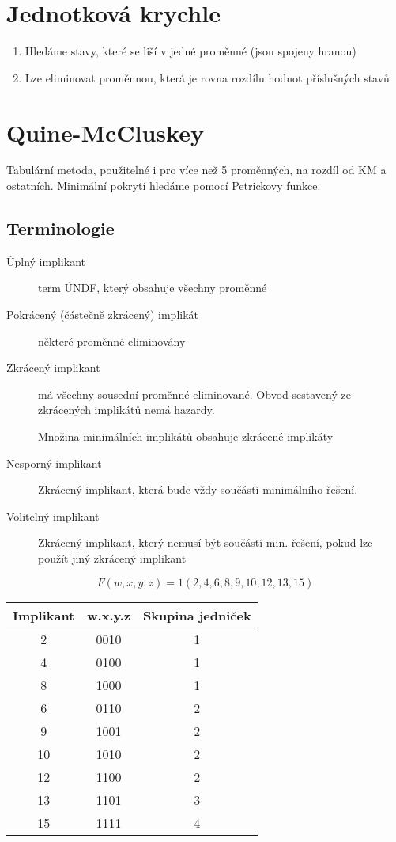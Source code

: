 \documentclass[a4paper, 11pt]{report}
\begin{document}
\section{Jednotková krychle}

\begin{enumerate}
	\item Hledáme stavy, které se liší v jedné proměnné (jsou spojeny hranou)
	\item Lze eliminovat proměnnou, která je rovna rozdílu hodnot příslušných stavů
\end{enumerate}

\section{Quine-McCluskey}

Tabulární metoda, použitelné i pro více než 5 proměnných, na rozdíl od KM a ostatních. Minimální pokrytí hledáme pomocí Petrickovy funkce.

\subsection{Terminologie}
\begin{description}
	\item[Úplný implikant] term ÚNDF, který obsahuje všechny proměnné
	\item[Pokrácený (částečně zkrácený) implikát] některé proměnné eliminovány
	\item[Zkrácený implikant] má všechny sousední proměnné eliminované. Obvod sestavený ze zkrácených implikátů nemá hazardy.
	\item[] Množina minimálních implikátů obsahuje zkrácené implikáty
	\item[Nesporný implikant] Zkrácený implikant, která bude vždy součástí minimálního řešení.
	\item[Volitelný implikant] Zkrácený implikant, který nemusí být součástí min. řešení, pokud lze použít jiný zkrácený implikant
\end{description}

$$F(w,x,y,z) = 1(2,4,6,8,9,10,12,13,15)$$
\begin{tabular}{ | c | c | c |}
	\hline
	Implikant & w.x.y.z & Skupina jedniček \\ \hline
	2	& 0010	& 1 \\ \hline
	4	& 0100	& 1 \\ \hline
	8	& 1000	& 1 \\ \hline
	6	& 0110	& 2 \\ \hline
	9	& 1001	& 2 \\ \hline
	10	& 1010	& 2 \\ \hline
	12	& 1100	& 2 \\ \hline
	13	& 1101	& 3 \\ \hline
	15	& 1111	& 4 \\ \hline
\end{tabular}
\end{document}
